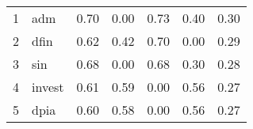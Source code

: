 \documentclass[12pt]{article}
\begin{document}
\begin{footnotesize}
\begin{longtable}{rl|c|c|c|c|c}
				1                    & adm                         & 0.70                             & 0.00                                                                                          & 0.73                                                                                          & 0.40                                                                                          & 0.30                                                                                                   \\
				2                    & dfin                        & 0.62                             & 0.42                                                                                          & 0.70                                                                                          & 0.00                                                                                          & 0.29                                                                                                   \\
				3                    & sin                         & 0.68                             & 0.00                                                                                          & 0.68                                                                                          & 0.30                                                                                          & 0.28                                                                                                   \\
				4                    & invest                      & 0.61                             & 0.59                                                                                          & 0.00                                                                                          & 0.56                                                                                          & 0.27                                                                                                   \\
				5                    & dpia                        & 0.60                             & 0.58                                                                                          & 0.00                                                                                          & 0.56                                                                                          & 0.27                                                                                                   \\

\end{longtable}
\end{footnotesize}
\end{document}
